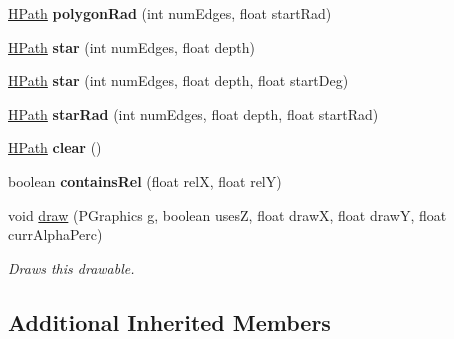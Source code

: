 \begin{DoxyCompactItemize}
\item 
\hypertarget{classhype_1_1drawable_1_1_h_path_a2e50e660109761776241d9c41e8fb132}{\hyperlink{classhype_1_1drawable_1_1_h_path}{H\-Path} {\bfseries polygon\-Rad} (int num\-Edges, float start\-Rad)}\label{classhype_1_1drawable_1_1_h_path_a2e50e660109761776241d9c41e8fb132}

\item 
\hypertarget{classhype_1_1drawable_1_1_h_path_a80d11cfd16ae84a07aa52b7d59e301ce}{\hyperlink{classhype_1_1drawable_1_1_h_path}{H\-Path} {\bfseries star} (int num\-Edges, float depth)}\label{classhype_1_1drawable_1_1_h_path_a80d11cfd16ae84a07aa52b7d59e301ce}

\item 
\hypertarget{classhype_1_1drawable_1_1_h_path_a7331d86a61b558eb840ac66da5a23f4e}{\hyperlink{classhype_1_1drawable_1_1_h_path}{H\-Path} {\bfseries star} (int num\-Edges, float depth, float start\-Deg)}\label{classhype_1_1drawable_1_1_h_path_a7331d86a61b558eb840ac66da5a23f4e}

\item 
\hypertarget{classhype_1_1drawable_1_1_h_path_acaae9c01f4b330740a387f6e55b82b7b}{\hyperlink{classhype_1_1drawable_1_1_h_path}{H\-Path} {\bfseries star\-Rad} (int num\-Edges, float depth, float start\-Rad)}\label{classhype_1_1drawable_1_1_h_path_acaae9c01f4b330740a387f6e55b82b7b}

\item 
\hypertarget{classhype_1_1drawable_1_1_h_path_aae95fc174db2c006e5cb7f2df99b5232}{\hyperlink{classhype_1_1drawable_1_1_h_path}{H\-Path} {\bfseries clear} ()}\label{classhype_1_1drawable_1_1_h_path_aae95fc174db2c006e5cb7f2df99b5232}

\item 
\hypertarget{classhype_1_1drawable_1_1_h_path_a2f3932e890ba712db9935def871ffc5d}{boolean {\bfseries contains\-Rel} (float rel\-X, float rel\-Y)}\label{classhype_1_1drawable_1_1_h_path_a2f3932e890ba712db9935def871ffc5d}

\item 
void \hyperlink{classhype_1_1drawable_1_1_h_path_af4d2d92b1c30aa6f9f7e91ab162364c0}{draw} (P\-Graphics g, boolean uses\-Z, float draw\-X, float draw\-Y, float curr\-Alpha\-Perc)
\begin{DoxyCompactList}\small\item\em Draws this drawable. \end{DoxyCompactList}\end{DoxyCompactItemize}
\subsection*{Additional Inherited Members}


